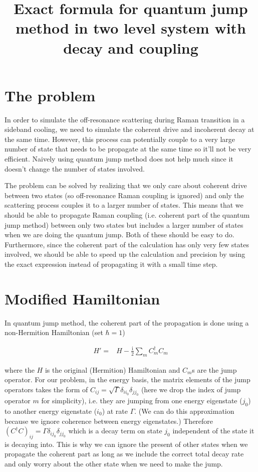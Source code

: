 \documentclass[10pt,fleqn]{article}
\title{Exact formula for quantum jump method in two level system with decay and coupling}
\newcommand{\ui}{\mathrm{i}}
\newcommand{\eqar}[1]
{
  \begin{align*}
    #1
  \end{align*}
}
\begin{document}
\maketitle

\section{The problem}
In order to simulate the off-resonance scattering during Raman transition in a sideband cooling,
we need to simulate the coherent drive and incoherent decay at the same time.
However, this process can potentially couple to a very large number of state that needs to be
propagate at the same time so it'll not be very efficient. Naively using quantum jump method
does not help much since it doesn't change the number of states involved.

The problem can be solved by realizing that we only care about coherent drive between two states
(so off-resonance Raman coupling is ignored) and only the scattering process couples it to a
larger number of states. This means that we should be able to propagate Raman coupling
(i.e. coherent part of the quantum jump method) between only two states but includes a larger
number of states when we are doing the quantum jump. Both of these should be easy to do.
Furthermore, since the coherent part of the calculation has only very few states involved,
we should be able to speed up the calculation and precision by using the exact expression instead
of propagating it with a small time step.

\section{Modified Hamiltonian}
In quantum jump method, the coherent part of the propagation is done using
a non-Hermition Hamiltonian (set $\hbar=1$)
\eqar{
  H'=&H-\frac{\ui}{2}\sum_m C^\dagger_mC_m
}
where the $H$ is the original (Hermition) Hamiltonian and $C_m$s are the jump operator.
For our problem, in the energy basis, the matrix elements of the jump operators takes the form of
$C_{ij}=\sqrt\Gamma\delta_{ii_0}\delta_{jj_0}$
(here we drop the index of jump operator $m$ for simplicity),
i.e. they are jumping from one energy eigenstate ($j_0$)
to another energy eigenstate ($i_0$) at rate $\Gamma$.
(We can do this approximation because we ignore coherence between energy eigenstates.)
Therefore $(C^\dagger C)_{ij}=\Gamma\delta_{ij_0}\delta_{jj_0}$ which is a decay term on state $j_0$
independent of the state it is decaying into.
This is why we can ignore the present of other states when we propagate the coherent part
as long as we include the correct total decay rate and only worry about the other state when
we need to make the jump.
\end{document}
